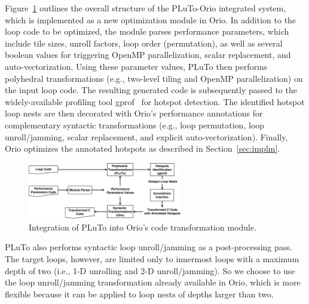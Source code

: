 Figure~\ref{fig:pluto-orio} outlines the overall structure of the PLuTo-Orio
integrated system, which is implemented as a new optimization module in
Orio.
In addition to the loop code to be optimized, the module parses performance
parameters, which include tile sizes, unroll factors, loop order
(permutation), as well as several boolean values for triggering OpenMP
parallelization, scalar replacement, and auto-vectorization. Using these
parameter values, PLuTo then performs polyhedral transformations (e.g.,
two-level tiling and OpenMP parallelization) on the input loop code. The
resulting generated code is subsequently passed to the widely-available
profiling tool gprof~\cite{gprof} for hotspot detection. 
The identified hotspot loop nests are then decorated with Orio's performance
annotations for complementary syntactic transformations (e.g., loop
permutation, loop unroll/jamming, scalar replacement, and explicit
auto-vectorization). Finally, Orio optimizes the annotated hotspots as 
described in Section~\ref{sec:implm}.

\begin{figure}[tb]
\begin{center}
\includegraphics[width=0.6\textwidth]{figures/pluto-orio.eps}    
\end{center}   
\vspace{-.2in}
\caption{Integration of PLuTo into Orio's code transformation module.}
\label{fig:pluto-orio}
\end{figure}  

PLuTo also performs syntactic loop unroll/jamming as a post-processing
pass. The target loops, however, are limited only to innermost loops with a
maximum depth of two (i.e., 1-D unrolling and 2-D unroll/jamming). So we
choose to use the loop unroll/jamming transformation already available in
Orio, which is more flexible because it can be applied to loop nests of
depths larger than two.


